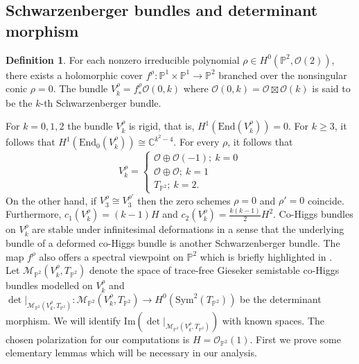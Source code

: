 \documentclass[12pt]{amsart}
\theoremstyle{definition}
\newtheorem{definition}[theorem]{Definition}
\theoremstyle{remark}
\numberwithin{equation}{section}
\begin{document}
\subsection{Schwarzenberger bundles and determinant morphism}\label{cohiggs}
\begin{definition}
For each nonzero irreducible polynomial $\rho\in H^0(\mathbb{P}^2, \mathcal{O}(2))$, there exists a holomorphic cover $f^\rho:\mathbb{P}^1\times\mathbb{P}^1\to\mathbb{P}^2$ branched over the nonsingular conic $\rho = 0$. The bundle $V_k^\rho = f^\rho_*\mathcal{O}(0, k)$ where $\mathcal{O}(0, k) = \mathcal{O}\boxtimes\mathcal{O}(k)$ is said to be the $k$-th Schwarzenberger bundle. 
\end{definition}
For $k = 0, 1, 2$ the bundle $V_k^\rho$ is rigid, that is, $H^1(\mbox{End}(V_k^\rho)) = 0$. For $k\geq 3$, it follows that  $H^1(\mbox{End}_0(V_k^\rho))\cong \mathbb{C}^{k^2 - 4}$. For every $\rho$, it follows that 
\begin{equation}
V_k^\rho =\begin{cases}
   \mathcal{O}\oplus\mathcal{O}(-1);~ k = 0\\
   \mathcal{O}\oplus\mathcal{O};~ k=1\\
   T_{\mathbb{P}^2};~ k=2.
\end{cases}\end{equation} On the other hand, if $V_3^\rho\cong V_3^{\rho'}$ then the zero schemes $\rho = 0$ and $\rho' = 0$ coincide. Furthermore, $c_1(V_k^\rho) = (k-1)H$ and $c_2(V_k^\rho) = \frac{k(k-1)}{2}H^2$. Co-Higgs bundles on $V_k^\rho$ are stable under infinitesimal deformations in a sense that the underlying bundle of a deformed co-Higgs bundle is another Schwarzenberger bundle. The map $f^\rho$ also offers a spectral viewpoint on $\mathbb{P}^2$ which is briefly highlighted in \cite{Ste3}.\\

Let $\mathcal{M}_{\mathbb{P}^2}(V_k^\rho, T_{\mathbb{P}^2})$ denote the space of trace-free Gieseker semistable co-Higgs bundles modelled on $V_k^\rho$ and $\det|_{\mathcal{M}_{\mathbb{P}^2}(V_k^\rho, T_{\mathbb{P}^2})}: {\mathcal{M}_{\mathbb{P}^2}(V_k^\rho, T_{\mathbb{P}^2})}\to H^0(\mbox{Sym}^2(T_{\mathbb{P}^2}))$ be the determinant morphism. We will identify $\mbox{Im}(\det|_{\mathcal{M}_{\mathbb{P}^2}(V_k^\rho, T_{\mathbb{P}^2})})$ with known spaces. The chosen polarization for our computations is $H = \mathcal{O}_{\mathbb{P}^2}(1)$. First we prove some elementary lemmas which will be necessary in our analysis.
\end{document}
